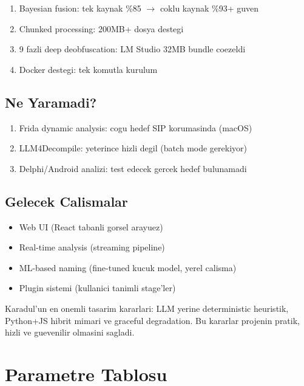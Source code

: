 \documentclass[12pt,a4paper,oneside]{book}
\theoremstyle{definition}
\begin{document}
\begin{enumerate}
\item Bayesian fusion: tek kaynak \%85 $\to$ coklu kaynak \%93+ guven
\item Chunked processing: 200MB+ dosya destegi
\item 9 fazli deep deobfuscation: LM Studio 32MB bundle coezeldi
\item Docker destegi: tek komutla kurulum
\end{enumerate}

\section{Ne Yaramadi?}

\begin{enumerate}
\item Frida dynamic analysis: cogu hedef SIP korumasinda (macOS)
\item LLM4Decompile: yeterince hizli degil (batch mode gerekiyor)
\item Delphi/Android analizi: test edecek gercek hedef bulunamadi
\end{enumerate}

\section{Gelecek Calismalar}

\begin{itemize}
\item Web UI (React tabanli gorsel arayuez)
\item Real-time analysis (streaming pipeline)
\item ML-based naming (fine-tuned kucuk model, yerel calisma)
\item Plugin sistemi (kullanici tanimli stage'ler)
\end{itemize}

\begin{ozet}
Karadul'un en onemli tasarim kararlari: LLM yerine deterministic heuristik, Python+JS hibrit mimari ve graceful degradation. Bu kararlar projenin pratik, hizli ve guevenilir olmasini sagladi.
\end{ozet}


\appendix
\chapter{Parametre Tablosu}
\label{app:params}
\end{document}
